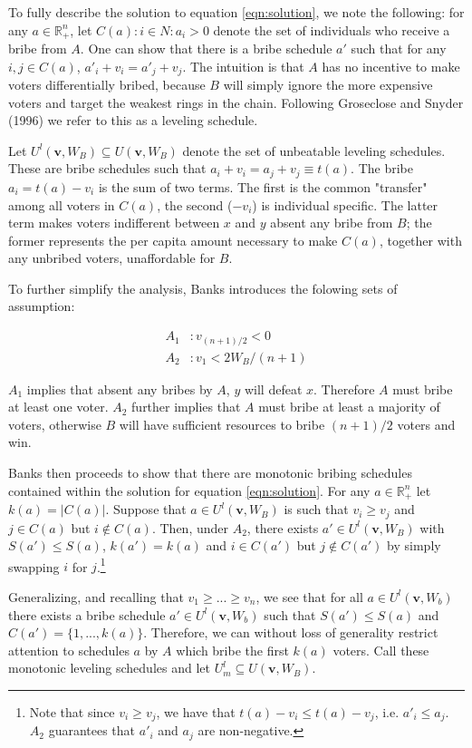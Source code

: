 \documentclass[12pt,a4paper]{article}
\newcommand{\real}{\mathbb{R}_+^n}
\begin{document}
To fully describe the solution to equation \ref{eqn:solution}, we note the following: for any $a \in \mathbb{R}_+^n$, let $C(a) : {i \in N : a_i > 0}$ denote the set of individuals who receive a bribe from $A$. One can show that there is a bribe schedule $a'$ such that for any $i,j \in C(a)$, $a'_i + v_i = a'_j + v_j$. The intuition is that $A$ has no incentive to make voters differentially bribed, because $B$ will simply ignore the more expensive voters and target the weakest rings in the chain. Following Groseclose and Snyder (1996) we refer to this as a leveling schedule.

Let $U^l(\mathbf{v}, W_B) \subseteq U(\mathbf{v}, W_B)$ denote the set of unbeatable leveling schedules. These are bribe schedules such that $a_i + v_i = a_j + v_j  \equiv t(a)$. The bribe $a_i = t(a) - v_i$ is the sum of two terms. The first is the common "transfer" among all voters in $C(a)$, the second ($-v_i$) is individual specific. The latter term makes voters indifferent between $x$ and $y$ absent any bribe from $B$; the former represents the per capita amount necessary to make $C(a)$, together with any unbribed voters, unaffordable for $B$.

To further simplify the analysis, Banks introduces the folowing sets of assumption:

\begin{align*}
    A_1 &: v_{(n+1)/2} < 0\\
    A_2 &: v_1 < 2W_B/(n+1) 
\end{align*}

$A_1$ implies that absent any bribes by $A$, $y$ will defeat $x$. Therefore $A$ must bribe at least one voter. $A_2$ further implies that $A$ must bribe at least a majority of voters, otherwise $B$ will have sufficient resources to bribe $(n+1)/2$ voters and win.

Banks then proceeds to show that there are monotonic bribing schedules contained within the solution for equation \ref{eqn:solution}. For any $a \in \real$ let $k(a) = \lvert C(a) \rvert$. Suppose that $a\in U^l(\mathbf{v}, W_B)$ is such that $v_i \geq v_j$ and $j \in C(a)$ but $i \notin C(a)$. Then, under $A_2$, there exists $a' \in U^l(\mathbf{v}, W_B)$ with $S(a') \leq S(a)$, $k(a') = k(a)$ and $i \in C(a')$ but $j \notin C(a')$ by simply swapping $i$ for $j$.\footnote{Note that since $v_i \geq v_j$, we have that $t(a) - v_i \leq  t(a) - v_j$, i.e. $a'_i \leq a_j$. $A_2$ guarantees that $a'_i$ and $a_j$ are non-negative.}

Generalizing, and recalling that $v_1 \geq ... \geq v_n$, we see that for all $a \in U^l(\mathbf{v}, W_b)$ there exists a bribe schedule $a' \in U^l(\mathbf{v}, W_b)$ such that $S(a') \leq S(a)$ and $C(a') = \{1, ..., k(a)\}$. Therefore, we can without loss of generality restrict attention to schedules $a$ by $A$ which bribe the first $k(a)$ voters. Call these monotonic leveling schedules and let $U_m^l \subseteq U(\mathbf{v}, W_B)$.
\end{document}
